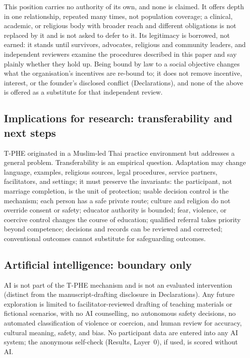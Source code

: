 \documentclass[10pt,twocolumn]{article}
\newcommand{\tphe}{T\mbox{-}PHE}
\begin{document}
This position carries no authority of its own, and none is claimed. It offers depth in one relationship, repeated many times, not population coverage; a clinical, academic, or religious body with broader reach and different obligations is not replaced by it and is not asked to defer to it. Its legitimacy is borrowed, not earned: it stands until survivors, advocates, religious and community leaders, and independent reviewers examine the procedures described in this paper and say plainly whether they hold up. Being bound by law to a social objective changes what the organisation's incentives are re-bound to; it does not remove incentive, interest, or the founder's disclosed conflict (Declarations), and none of the above is offered as a substitute for that independent review.

\subsection{Implications for research: transferability and next steps}
\tphe{} originated in a Muslim-led Thai practice environment but addresses a general problem. Transferability is an empirical question. Adaptation may change language, examples, religious sources, legal procedures, service partners, facilitators, and settings; it must preserve the invariants: the participant, not marriage completion, is the unit of protection; usable decision control is the mechanism; each person has a safe private route; culture and religion do not override consent or safety; educator authority is bounded; fear, violence, or coercive control changes the course of education; qualified referral takes priority beyond competence; decisions and records can be reviewed and corrected; conventional outcomes cannot substitute for safeguarding outcomes.

\subsection{Artificial intelligence: boundary only}
AI is not part of the \tphe{} mechanism and is not an evaluated intervention (distinct from the manuscript-drafting disclosure in Declarations). Any future exploration is limited to facilitator-reviewed drafting of teaching materials or fictional scenarios, with no AI counselling, no autonomous safety decisions, no automated classification of violence or coercion, and human review for accuracy, cultural meaning, safety, and bias. No participant data are entered into any AI system; the anonymous self-check (Results, Layer~0), if used, is scored without AI.
\end{document}
